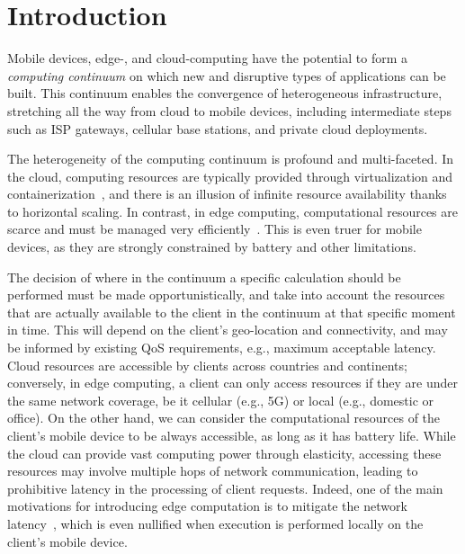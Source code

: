 \section{Introduction}
\label{sec:intro}

Mobile devices, edge-, and cloud-computing have the potential to form a \textit{computing continuum} on which new and disruptive types of applications can be built. This continuum enables the 
convergence of heterogeneous infrastructure, stretching all the way from cloud
to mobile devices, including intermediate steps such as ISP gateways, cellular base stations, and private cloud deployments.

The heterogeneity of the computing continuum is profound and multi-faceted. In the cloud, computing resources are typically provided through virtualization and containerization~\cite{leitner2016patterns, Quatrocchi2016discrete}, and there is an illusion of infinite resource availability thanks to horizontal scaling. In contrast, in edge computing, computational resources are scarce and must be managed very efficiently~\cite{Shi:2016, GarrigaMendonca2017}. This is even truer for mobile devices, as they are strongly constrained by battery and other limitations. 


The decision of where in the continuum a specific calculation should be performed must be made opportunistically, and take into account the resources that are actually available to the client in the continuum at that specific moment in time. This will depend on the client's geo-location and connectivity, and may be informed by existing QoS requirements, e.g., maximum acceptable latency. Cloud resources are accessible by clients across countries and continents; conversely, in edge computing, a client can only access resources if they are under the same network coverage, be it cellular (e.g., 5G) or local (e.g., domestic or office). On the other hand, we can consider the computational resources of the client's mobile device to be always accessible, as long as it has battery life. While the cloud can provide vast computing power through elasticity, accessing these resources may involve multiple hops of network communication, leading to prohibitive latency in the processing of client requests. Indeed, one of the main motivations for introducing edge computation is to mitigate the network latency~\cite{Shi:2016}, which is even nullified when execution is performed locally on the client's mobile device.

